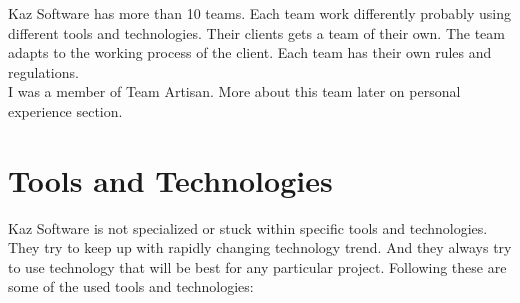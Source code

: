 Kaz Software has more than 10 teams.
Each team work differently probably using different tools and technologies.
Their clients gets a team of their own.
The team adapts to the working process of the client.
Each team has their own rules and regulations.\\

I was a member of Team Artisan.
More about this team later on personal experience section.

\section{Tools and Technologies}

Kaz Software is not specialized or stuck within specific tools and technologies.
They try to keep up with rapidly changing technology trend.
And they always try to use technology that will be best for any particular project.
Following these are some of the used tools and technologies:

